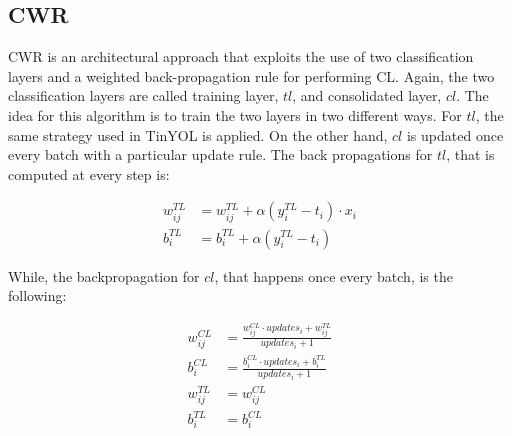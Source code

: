 \documentclass[12pt]{report}
\begin{document}
\subsection{CWR}
CWR is an architectural approach that exploits the use of two classification layers and a weighted back-propagation rule for performing CL. Again, the two classification layers are called training layer, $tl$, and consolidated layer, $cl$. The idea for this algorithm is to train the two layers in two different ways. For $tl$, the same strategy used in TinYOL is applied. On the other hand, $cl$ is updated once every batch with a particular update rule. The back propagations for $tl$, that is computed at every step is:

\begin{align}
	w^{TL}_{ij} &= w^{TL}_{ij} + \alpha (y^{TL}_i - t_i) \cdot x_i \\
    b^{TL}_i    &= b^{TL}_i + \alpha  (y^{TL}_i - t_i) 
\end{align}

While, the backpropagation for $cl$, that happens once every batch, is the following:

\begin{align}
	w^{CL}_{ij} &= \frac{w^{CL}_{ij} \cdot updates_{i} + w^{TL}_{ij}}{updates_{i} + 1} \label{cwrweight}\\ 
	b^{CL}_{i}  &= \frac{b^{CL}_{i} \cdot updates_{i} + b^{TL}_{i}}{updates_{i} + 1} \\ 
    w^{TL}_{ij} &=  w^{CL}_{ij} \\
    b^{TL}_{i}  &=  b^{CL}_{i} 
\end{align}
\end{document}
